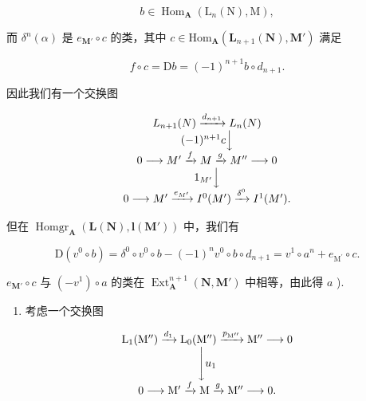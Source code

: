 \[
b \in \operatorname{Hom} _ {\mathbf {A}} \left(\mathrm{L} _ {n} (\mathrm{N}), \mathrm{M}\right),
\]

而 \(\delta^n (\alpha)\) 是 \(e_{\mathbf{M}'}\circ c\) 的类，其中 \(c\in \mathrm{Hom}_{\mathbf{A}}\left(\mathbf{L}_{n + 1}(\mathbf{N}),\mathbf{M}'\right)\) 满足

\[
f \circ c = \mathrm{D} b = (- 1) ^ {n + 1} b \circ d _ {n + 1}.
\]

因此我们有一个交换图

\[
\begin{array}{c} L _ {n + 1} (N) \xrightarrow {d _ {n + 1}} L _ {n} (N) \\ (- 1) ^ {n + 1} c \Big \downarrow \\ 0 \longrightarrow M ^ {\prime} \xrightarrow {f} M \xrightarrow {g} M ^ {\prime \prime} \longrightarrow 0 \\ 1 _ {M ^ {\prime}} \Big \downarrow \\ 0 \longrightarrow M ^ {\prime} \xrightarrow {e _ {M ^ {\prime}}} I ^ {0} (M ^ {\prime}) \xrightarrow {\delta^ {0}} I ^ {1} (M ^ {\prime}). \end{array}
\]

但在 \(\operatorname{Homgr}_{\mathbf{A}}(\mathbf{L}(\mathbf{N}), \mathbf{l}(\mathbf{M}'))\) 中，我们有

\[
\mathrm{D} \left(v ^ {0} \circ b\right) = \delta^ {0} \circ v ^ {0} \circ b - (- 1) ^ {n} v ^ {0} \circ b \circ d _ {n + 1} = v ^ {1} \circ a ^ {n} + e _ {\mathrm{M} ^ {\prime}} \circ c.
\]

\(e_{\mathbf{M}'} \circ c\) 与 \((-v^1) \circ a\) 的类在 \(\operatorname{Ext}_{\mathbf{A}}^{n+1}(\mathbf{N}, \mathbf{M}')\) 中相等，由此得 \(a\) ).

\begin{enumerate}
\def\labelenumi{\alph{enumi})}
\setcounter{enumi}{1}
\tightlist
\item
  考虑一个交换图
\end{enumerate}

\[
\begin{array}{c} \mathrm{L} _ {1} (\mathrm{M} ^ {\prime \prime}) \xrightarrow {d _ {1}} \mathrm{L} _ {0} (\mathrm{M} ^ {\prime \prime}) \xrightarrow {p _ {\mathrm{M} ^ {\prime \prime}}} \mathrm{M} ^ {\prime \prime} \longrightarrow 0 \\ \Biggl \downarrow u _ {1} \\ 0 \longrightarrow \mathrm{M} ^ {\prime} \xrightarrow {f} \mathrm{M} \xrightarrow {g} \mathrm{M} ^ {\prime \prime} \longrightarrow 0. \end{array}
\]

